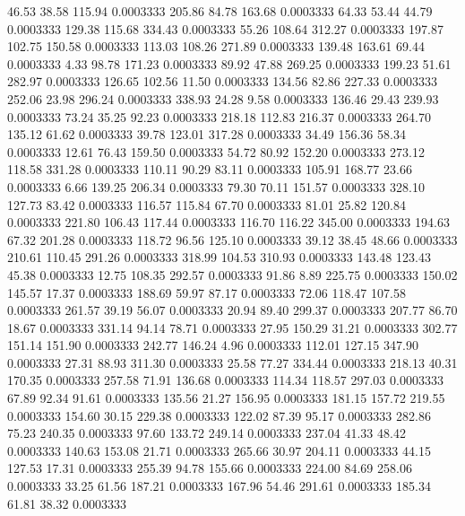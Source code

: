   46.53   38.58  115.94   0.0003333
 205.86   84.78  163.68   0.0003333
  64.33   53.44   44.79   0.0003333
 129.38  115.68  334.43   0.0003333
  55.26  108.64  312.27   0.0003333
 197.87  102.75  150.58   0.0003333
 113.03  108.26  271.89   0.0003333
 139.48  163.61   69.44   0.0003333
   4.33   98.78  171.23   0.0003333
  89.92   47.88  269.25   0.0003333
 199.23   51.61  282.97   0.0003333
 126.65  102.56   11.50   0.0003333
 134.56   82.86  227.33   0.0003333
 252.06   23.98  296.24   0.0003333
 338.93   24.28    9.58   0.0003333
 136.46   29.43  239.93   0.0003333
  73.24   35.25   92.23   0.0003333
 218.18  112.83  216.37   0.0003333
 264.70  135.12   61.62   0.0003333
  39.78  123.01  317.28   0.0003333
  34.49  156.36   58.34   0.0003333
  12.61   76.43  159.50   0.0003333
  54.72   80.92  152.20   0.0003333
 273.12  118.58  331.28   0.0003333
 110.11   90.29   83.11   0.0003333
 105.91  168.77   23.66   0.0003333
   6.66  139.25  206.34   0.0003333
  79.30   70.11  151.57   0.0003333
 328.10  127.73   83.42   0.0003333
 116.57  115.84   67.70   0.0003333
  81.01   25.82  120.84   0.0003333
 221.80  106.43  117.44   0.0003333
 116.70  116.22  345.00   0.0003333
 194.63   67.32  201.28   0.0003333
 118.72   96.56  125.10   0.0003333
  39.12   38.45   48.66   0.0003333
 210.61  110.45  291.26   0.0003333
 318.99  104.53  310.93   0.0003333
 143.48  123.43   45.38   0.0003333
  12.75  108.35  292.57   0.0003333
  91.86    8.89  225.75   0.0003333
 150.02  145.57   17.37   0.0003333
 188.69   59.97   87.17   0.0003333
  72.06  118.47  107.58   0.0003333
 261.57   39.19   56.07   0.0003333
  20.94   89.40  299.37   0.0003333
 207.77   86.70   18.67   0.0003333
 331.14   94.14   78.71   0.0003333
  27.95  150.29   31.21   0.0003333
 302.77  151.14  151.90   0.0003333
 242.77  146.24    4.96   0.0003333
 112.01  127.15  347.90   0.0003333
  27.31   88.93  311.30   0.0003333
  25.58   77.27  334.44   0.0003333
 218.13   40.31  170.35   0.0003333
 257.58   71.91  136.68   0.0003333
 114.34  118.57  297.03   0.0003333
  67.89   92.34   91.61   0.0003333
 135.56   21.27  156.95   0.0003333
 181.15  157.72  219.55   0.0003333
 154.60   30.15  229.38   0.0003333
 122.02   87.39   95.17   0.0003333
 282.86   75.23  240.35   0.0003333
  97.60  133.72  249.14   0.0003333
 237.04   41.33   48.42   0.0003333
 140.63  153.08   21.71   0.0003333
 265.66   30.97  204.11   0.0003333
  44.15  127.53   17.31   0.0003333
 255.39   94.78  155.66   0.0003333
 224.00   84.69  258.06   0.0003333
  33.25   61.56  187.21   0.0003333
 167.96   54.46  291.61   0.0003333
 185.34   61.81   38.32   0.0003333
